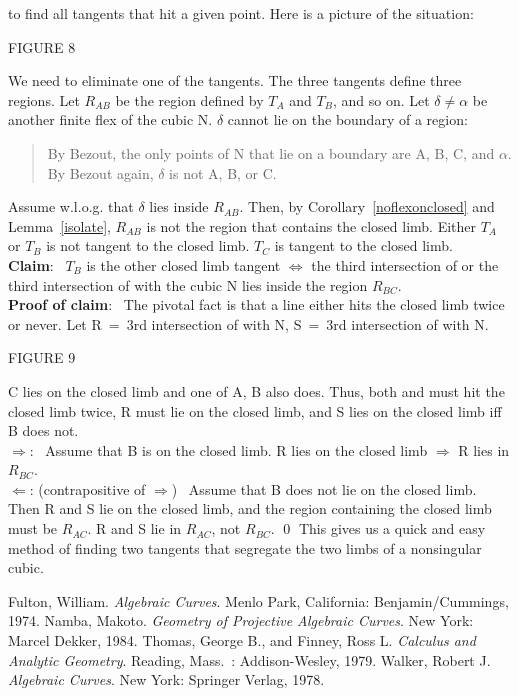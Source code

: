 to find all tangents that hit a given point.
Here is a picture of the situation:
\begin{center}
FIGURE 8
\end{center}
We need to eliminate one of the tangents.
The three tangents define three regions.  
Let $R_{AB}$ be the region defined by $T_{A}$ and $T_{B}$, and so on.
Let $\delta \neq \alpha$ be another finite flex 
of the cubic N.
$\delta$ cannot lie on the boundary of a region:
\begin{quote}
	By Bezout, the only points of N that lie on a boundary are
	A, B, C, and $\alpha$.  By Bezout again, $\delta$ is not
	A, B, or C.
\end{quote}
Assume w.l.o.g. that $\delta$ lies inside $R_{AB}$.
Then, by Corollary~\ref{noflexonclosed} and Lemma~\ref{isolate},
$R_{AB}$ is not the region that contains the closed limb.
\hence Either $T_{A}$ or $T_{B}$ is not tangent to the closed limb.
\hence $T_{C}$ is tangent to the closed limb.\vspace{.25in} \\
{\bf Claim}: \ $T_{B}$ is the other closed limb tangent $\Leftrightarrow$
the third intersection of  or the third intersection of 
with the cubic N lies inside the region $R_{BC}$.\vspace{.25in} \\
{\bf Proof of claim}: \ The pivotal fact is that a line either hits the
closed limb twice or never.
Let R~=~3rd intersection of  with N,
S~=~3rd intersection of  with N.
\begin{center}
FIGURE 9
\end{center}
C lies on the closed limb and one of A, B also does.
Thus, both  and  must hit the closed limb twice,
R must lie on the closed limb, and S lies on the closed limb iff B
does not.\vspace{.25in} \\
$\Rightarrow$: \ Assume that B is on the closed limb.
R lies on the closed limb $\Rightarrow$ R lies in $R_{BC}$.\vspace{.25in} \\
$\Leftarrow$: (contrapositive of $\Rightarrow$) \ Assume that
B does not lie on
the closed limb.  Then R and S lie on the closed limb, and
the region containing the closed limb must be $R_{AC}$.
\hence R and S lie in $R_{AC}$, not $R_{BC}$.
\qed
This gives us a quick and easy method of finding two tangents that
segregate the two limbs of a nonsingular cubic.
\begin{thebibliography}{The longest}
 Fulton, William.
{\em Algebraic Curves}.
Menlo Park, California: Benjamin/Cummings, 1974.
 Namba, Makoto.
{\em Geometry of Projective Algebraic Curves}.
New York: Marcel Dekker, 1984.
 Thomas, George B., and Finney, Ross L.
{\em Calculus and Analytic Geometry}.
Reading, Mass.\ :  Addison-Wesley, 1979.
 Walker, Robert J. 
{\em Algebraic Curves}.
New York: Springer Verlag, 1978.
\end{thebibliography}

